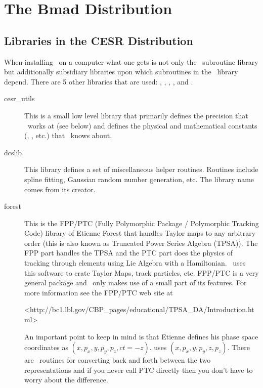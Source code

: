 \chapter{The Bmad Distribution}
\label{c:distribution}

\section{Libraries in the CESR Distribution}
\label{s:libs}

When installing \bmad\ on a computer what one gets is not only the
\bmad\ subroutine library but additionally subsidiary libraries upon
which subroutines in the \bmad\ library depend. There are 5 other
libraries that are used: , ,
, , and .
\begin{description}
\item[cesr\_utils] This is a small low level library that primarily defines 
the precision that \bmad\ works at (see below) and defines the physical
and mathematical constants (, , etc.) that \bmad\ knows
about.
\item[dcslib] This library defines a set of miscellaneous helper routines. 
Routines include spline fitting, Gaussian random number generation,
etc. The library name comes from its creator.
\item[forest] This is the FPP/PTC 
(Fully Polymorphic Package / Polymorphic Tracking Code) library of
Etienne Forest that handles Taylor maps to any arbitrary order (this
is also known as Truncated Power Series Algebra (TPSA)). The FPP part
handles the TPSA and the PTC part does the physics of tracking through
elements using Lie Algebra with a Hamiltonian.  \bmad\ uses this
software to crate Taylor Maps, track particles, etc.  FPP/PTC is a
very general package and \bmad\ only makes use of a small part of its
features. For more information see the FPP/PTC web site at
\begin{example} 
    <http://bc1.lbl.gov/CBP_pages/educational/TPSA_DA/Introduction.html>
\end{example}

An important point to keep in mind is that Etienne defines his phase
space coordinates as $(x, p_x, y, p_y, p_z, ct = -z)$. \bmad uses
$(x, p_x, y, p_y, z, p_z)$. There are
\bmad\ routines for converting back and forth between the two 
representations and if you never call PTC directly then you don't
have to worry about the difference.


\end{description}
